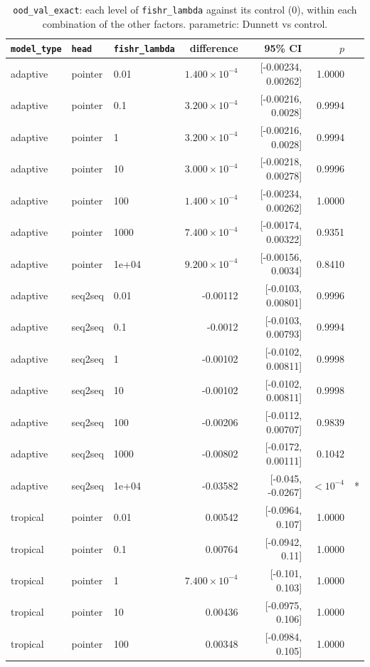 \documentclass[10pt]{article}
\begin{document}
{\small
\begin{longtable}{lllrrrl}
\caption{\texttt{ood\_val\_exact}: each level of \texttt{fishr\_lambda} against its control (0), within each combination of the other factors. parametric: Dunnett vs control.}\label{tab:control-ood_val_exact}\\
\toprule
\texttt{model\_type} & \texttt{head} & \texttt{fishr\_lambda} & difference & 95\% CI & $p$ & \\
\midrule
\endhead
adaptive & pointer & 0.01 & $1.400\times10^{-4}$ & [-0.00234, 0.00262] & 1.0000 & \\
adaptive & pointer & 0.1 & $3.200\times10^{-4}$ & [-0.00216, 0.0028] & 0.9994 & \\
adaptive & pointer & 1 & $3.200\times10^{-4}$ & [-0.00216, 0.0028] & 0.9994 & \\
adaptive & pointer & 10 & $3.000\times10^{-4}$ & [-0.00218, 0.00278] & 0.9996 & \\
adaptive & pointer & 100 & $1.400\times10^{-4}$ & [-0.00234, 0.00262] & 1.0000 & \\
adaptive & pointer & 1000 & $7.400\times10^{-4}$ & [-0.00174, 0.00322] & 0.9351 & \\
adaptive & pointer & 1e+04 & $9.200\times10^{-4}$ & [-0.00156, 0.0034] & 0.8410 & \\
adaptive & seq2seq & 0.01 & -0.00112 & [-0.0103, 0.00801] & 0.9996 & \\
adaptive & seq2seq & 0.1 & -0.0012 & [-0.0103, 0.00793] & 0.9994 & \\
adaptive & seq2seq & 1 & -0.00102 & [-0.0102, 0.00811] & 0.9998 & \\
adaptive & seq2seq & 10 & -0.00102 & [-0.0102, 0.00811] & 0.9998 & \\
adaptive & seq2seq & 100 & -0.00206 & [-0.0112, 0.00707] & 0.9839 & \\
adaptive & seq2seq & 1000 & -0.00802 & [-0.0172, 0.00111] & 0.1042 & \\
adaptive & seq2seq & 1e+04 & -0.03582 & [-0.045, -0.0267] & $<10^{-4}$ & *\\
tropical & pointer & 0.01 & 0.00542 & [-0.0964, 0.107] & 1.0000 & \\
tropical & pointer & 0.1 & 0.00764 & [-0.0942, 0.11] & 1.0000 & \\
tropical & pointer & 1 & $7.400\times10^{-4}$ & [-0.101, 0.103] & 1.0000 & \\
tropical & pointer & 10 & 0.00436 & [-0.0975, 0.106] & 1.0000 & \\
tropical & pointer & 100 & 0.00348 & [-0.0984, 0.105] & 1.0000 & \\

\end{longtable}}
\end{document}

